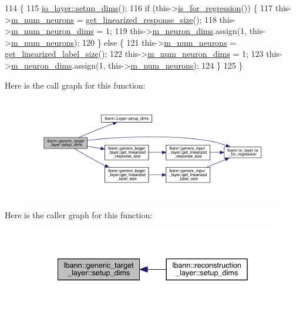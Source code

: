 \begin{DoxyCode}
114                              \{
115     \hyperlink{classlbann_1_1Layer_a90fce1b06c1f2abb480e18cfe08a9746}{io\_layer::setup\_dims}();
116     \textcolor{keywordflow}{if} (this->\hyperlink{classlbann_1_1io__layer_a61f2e00334c820235795154492876476}{is\_for\_regression}()) \{
117       this->\hyperlink{classlbann_1_1Layer_a6b5ebc8a7d9329d8a773ed787e7b41d8}{m\_num\_neurons} = \hyperlink{classlbann_1_1generic__target__layer_a55c3e1bcb3e4611c379b1082183b3e66}{get\_linearized\_response\_size}();
118       this->\hyperlink{classlbann_1_1Layer_adfd6178d21498c9095cd947ae1eb2d6a}{m\_num\_neuron\_dims} = 1;
119       this->\hyperlink{classlbann_1_1Layer_abb34bb8031f57a483e2e327a5f229f48}{m\_neuron\_dims}.assign(1, this->\hyperlink{classlbann_1_1Layer_a6b5ebc8a7d9329d8a773ed787e7b41d8}{m\_num\_neurons});
120     \} \textcolor{keywordflow}{else} \{
121       this->\hyperlink{classlbann_1_1Layer_a6b5ebc8a7d9329d8a773ed787e7b41d8}{m\_num\_neurons} = \hyperlink{classlbann_1_1generic__target__layer_a8a266291fb01fbcec5cac5fefdef56eb}{get\_linearized\_label\_size}();
122       this->\hyperlink{classlbann_1_1Layer_adfd6178d21498c9095cd947ae1eb2d6a}{m\_num\_neuron\_dims} = 1;
123       this->\hyperlink{classlbann_1_1Layer_abb34bb8031f57a483e2e327a5f229f48}{m\_neuron\_dims}.assign(1, this->\hyperlink{classlbann_1_1Layer_a6b5ebc8a7d9329d8a773ed787e7b41d8}{m\_num\_neurons});
124     \}
125   \}
\end{DoxyCode}
Here is the call graph for this function\+:\nopagebreak
\begin{figure}[H]
\begin{center}
\leavevmode
\includegraphics[width=350pt]{classlbann_1_1generic__target__layer_a3a970c1b23f7367276f7061563fc8b65_cgraph}
\end{center}
\end{figure}
Here is the caller graph for this function\+:\nopagebreak
\begin{figure}[H]
\begin{center}
\leavevmode
\includegraphics[width=335pt]{classlbann_1_1generic__target__layer_a3a970c1b23f7367276f7061563fc8b65_icgraph}
\end{center}
\end{figure}
